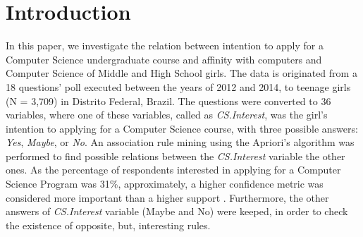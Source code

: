 \section{Introduction}\label{sec:intro}%
%

%
In this paper, we investigate the relation between intention to apply for a Computer Science undergraduate course and affinity with computers and Computer Science of Middle and High School girls. The data is originated from a 18 questions' poll executed between the years of 2012 and 2014, to teenage girls (N = 3,709) in Distrito Federal, Brazil. 
The questions were converted to 36 variables, where one of these variables, called as \emph{CS.Interest},  was the girl's intention to applying for a Computer Science course, with three possible answers: \emph{Yes}, \emph{Maybe}, or \emph{No}. An association rule mining using the Apriori's algorithm was performed to find possible relations between the \emph{CS.Interest} variable the other ones. 
As the percentage of respondents interested in applying for a Computer Science Program was 31\%, approximately, a higher confidence metric was considered more important than a higher support \cite{taniar_exception_2008}. Furthermore, the other answers of \emph{CS.Interest} variable (Maybe and No) were keeped, in order to check the existence of opposite, but, interesting rules.

%
